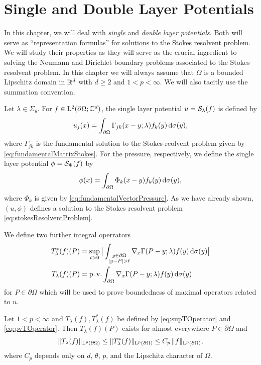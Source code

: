 \chapter{Single and Double Layer Potentials}

In this chapter, we will deal with \emph{single} and \emph{double layer potentials}.
Both will serve as ``representation formulas'' for solutions to the Stokes resolvent problem.
We will study their properties as they will serve as the crucial ingredient to solving the Neumann and Dirichlet boundary problems associated to the Stokes resolvent problem.
In this chapter we will always assume that $\Omega$ is a bounded Lipschitz domain in $\mathbb{R}^d$ with $d \geq 2$ and $1 < p < \infty$.
We will also tacitly use the summation convention.

Let $\lambda \in \Sigma_\theta$. 
For $f \in \mathrm{L}^2(\partial\Omega; \mathbb{C}^d)$, the single layer potential $u = \mathcal{S}_\lambda(f)$ is defined by
\begin{align}
  \label{eq:defSingleLayer}
  u_j(x) 
  = \int_{\partial\Omega} \Gamma_{jk}(x - y; \lambda) f_k(y) \, {\operatorname{d}\!{\sigma}}(y),
\end{align}
where $\Gamma_{jk}$ is the fundamental solution to the Stokes reolvent problem given by \eqref{eq:fundamentalMatrixStokes}.
For the pressure, respectively, we define the single layer potential $\phi = \mathcal{S}_\Phi(f)$ by
\begin{align}
  \label{eq:defSingleLayerPressure}
  \phi(x) = \int_{\partial\Omega} \Phi_k(x - y) f_k(y) \, {\operatorname{d}\!{\sigma}}(y),
\end{align}
where $\Phi_k$ is given by \eqref{eq:fundamentalVectorPressure}.
As we have already shown, $(u,\phi)$ defines a solution to the Stokes resolvent problem \eqref{eq:stokesResolventProblem}.

We define two further integral operrators
\begin{align}
  T_\lambda^*(f)(P) &= \sup_{t > 0} \big| \int_{\substack{y \in \partial\Omega \\ |y - P| > t}} \nabla_x \Gamma(P - y; \lambda) f(y) \, {\operatorname{d}\!{\sigma}}(y) \big| \label{eq:supTOperator}\\
  T_\lambda(f)(P) &= \operatorname{p. v.} \int_{\partial\Omega} \nabla_x \Gamma(P - y; \lambda) f(y) \, {\operatorname{d}\!{\sigma}}(y) \label{eq:pvTOperator}
\end{align}
for $P \in \partial\Omega$ which will be used to prove boundedness of maximal operators related to $u$.

\begin{lem}
  \label{lem:lpBoundednessT}
  Let $1 < p < \infty$ and $T_\lambda(f), T_\lambda^*(f)$ be defined by \eqref{eq:supTOperator} and \eqref{eq:pvTOperator}.
  Then $T_\lambda(f)(P)$ exists for almost everywhere $P \in \partial\Omega$ and
  \begin{align}
    \label{eq:lpBoundednessT}
    \|T_\lambda(f) \|_{\mathrm{L}^p(\partial\Omega)} 
    \leq \|T_\lambda^*(f) \|_{\mathrm{L}^p(\partial\Omega)}
    \leq C_p \, \|f\|_{\mathrm{L}^p(\partial\Omega)},
  \end{align}
  where $C_p$ depends only on $d$, $\theta$, $p$, and the Lipschitz character of $\Omega$.
\end{lem}

